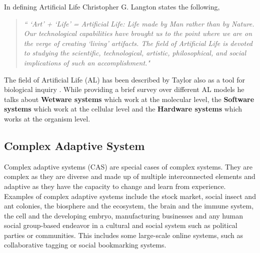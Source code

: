 In defining Artificial Life Christopher G. Langton states the following,

\begin{quote}
\textsl{`` `Art' + `Life' = Artificial Life: Life made by Man rather than by Nature. Our technological capabilities have brought us to the point where we are on the verge of creating `living' artifacts. The field of Artificial Life is devoted to studying the scientific, technological, artistic, philosophical, and social implications of such an accomplishment."}
\end{quote}

The field of Artificial Life (AL) has been described by Taylor also as a tool for biological inquiry \cite{taylor1993}. While providing a brief survey over different AL models he talks about \textbf{Wetware systems} which work at the molecular level, the \textbf{Software systems} which work at the cellular level and the \textbf{Hardware systems} which works at the organism level.






\subsection{Complex Adaptive System}
\label{subsec:complex-adaptive-system}
Complex adaptive systems (CAS) are special cases of complex systems. They are complex as they are diverse and made up of multiple interconnected elements and adaptive as they have the capacity to change and learn from experience. Examples of complex adaptive systems include the stock market, social insect and ant colonies, the biosphere and the ecosystem, the brain and the immune system, the cell and the developing embryo, manufacturing businesses and any human social group-based endeavor in a cultural and social system such as political parties or communities. This includes some large-scale online systems, such as collaborative tagging or social bookmarking systems.

